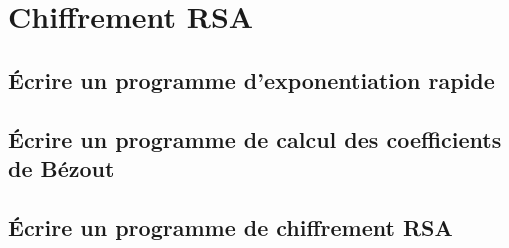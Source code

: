 \chapter{Chiffrement RSA}

\section{Écrire un programme d'exponentiation rapide}

\section{Écrire un programme de calcul des coefficients de Bézout}

\section{Écrire un programme de chiffrement RSA}